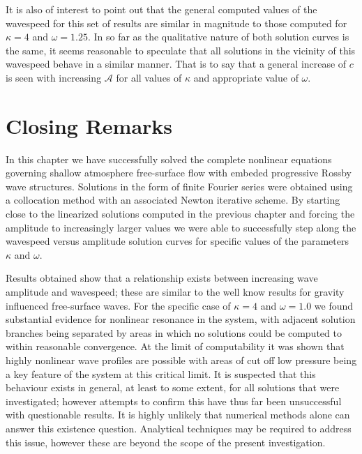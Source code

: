 It is also of interest to point out that the general computed values of the wavespeed for this set of results are similar in magnitude to those computed for $\kappa=4$ and $\omega=1.25$. In so far as the qualitative nature of both solution curves is the same, it seems reasonable to speculate that all solutions in the vicinity of this wavespeed behave in a similar manner. That is to say that a general increase of $c$ is seen with increasing $\mathcal{A}$ for all values of $\kappa$ and appropriate value of $\omega$.

\section{Closing Remarks}
In this chapter we have successfully solved the complete nonlinear equations governing shallow atmosphere free-surface flow with embeded progressive Rossby wave structures. Solutions in the form of finite Fourier series were obtained using a collocation method with an associated Newton iterative scheme. By starting close to the linearized solutions computed in the previous chapter and forcing the amplitude to increasingly larger values we were able to successfully step along the wavespeed versus amplitude solution curves for specific values of the parameters $\kappa$ and $\omega$.

Results obtained show that a relationship exists between increasing wave amplitude and wavespeed; these are similar to the well know results for gravity influenced free-surface waves. For the specific case of $\kappa=4$ and $\omega=1.0$ we found substantial evidence for nonlinear resonance in the system, with adjacent solution branches being separated by areas in which no solutions could be computed to within reasonable convergence. At the limit of computability it was shown that highly nonlinear wave profiles are possible with areas of cut off low pressure being a key feature of the system at this critical limit. It is suspected that this behaviour exists in general, at least to some extent, for all solutions that were investigated; however attempts to confirm this have thus far been unsuccessful with questionable results. It is highly unlikely that numerical methods alone can answer this existence question. Analytical techniques may be required to address this issue, however these are beyond the scope of the present investigation.
